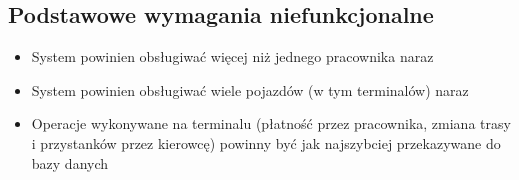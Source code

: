 \subsection{Podstawowe wymagania niefunkcjonalne}
\begin{itemize}
  \item{System powinien obsługiwać więcej niż jednego pracownika naraz}
  \item{System powinien obsługiwać wiele pojazdów (w tym terminalów) naraz}
  \item{Operacje wykonywane na terminalu (płatność przez pracownika, zmiana trasy i przystanków przez kierowcę) powinny być jak najszybciej przekazywane do bazy danych}
\end{itemize}
